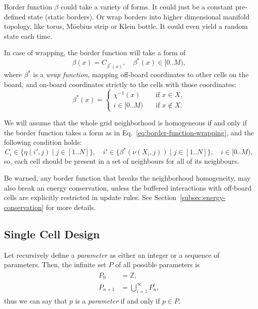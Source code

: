 \documentclass[a4paper,12pt,tikz,UTF8]{article}
\begin{document}
    Border function $\beta$ could take a variety of forms. It could just be a constant pre-defined state (static borders). Or wrap borders into higher dimensional manifold topology, like torus, M{\"o}ebius strip or Klein bottle. It could even yield a random state each time.

    In case of wrapping, the border function will take a form of
    \begin{equation}
      \label{eq:border-function-wrapping}
      \beta(x) = C_{\beta^*(x)}, \quad \beta^*(x) \in {[0 .. M)},
    \end{equation}
    where $\beta^*$ is a \textit{wrap function}, mapping off-board coordinates to other cells on the board, and on-board coordinates strictly to the cells with those coordinates:
    \begin{equation}
      \beta^*(x) = 
      \begin{cases}
        \chi^{-1}(x) & \quad \text{if } x \in X,\\
        i \in {[0 .. M)} & \quad \text{if } x \notin X.
      \end{cases}
    \end{equation}

    We will assume that the whole grid neighborhood is homogeneous if and only if the border function takes a form as in Eq.~\ref{eq:border-function-wrapping}, and the following condition holds:
    \begin{equation}
      \label{eq:neighborhood-homogeneity}
      C_i \in \{ \eta(i', j) \mid j \in {[1 .. N]} \}, \quad i' \in \{ \beta^*(\nu(X_i, j)) \mid j \in {[1 .. N]} \}, \quad i \in {[0 .. M)},
    \end{equation}
    so, each cell should be present in a set of neighbours for all of its neighbours.

    Be warned, any border function that breaks the neighborhood homogeneity, may also break an energy conservation, unless the buffered interactions with off-board cells are explicitly restricted in update rules. See Section~\ref{subsec:energy-conservation} for more details.

  \subsection{Single Cell Design}

    Let recursively define a \textit{parameter} as either an integer or a sequence of parameters. Then, the infinite set $P$ of all possible parameters is
    \begin{align}
      \begin{split}
        P_0 &= \mathbb{Z},\\
        P_{n + 1} &= \bigcup_{i=1}^\infty{P_n^i,}
      \end{split}
    \end{align}
    thus we can say that $p$ is a \textit{parameter} if and only if $p \in P$.
\end{document}
